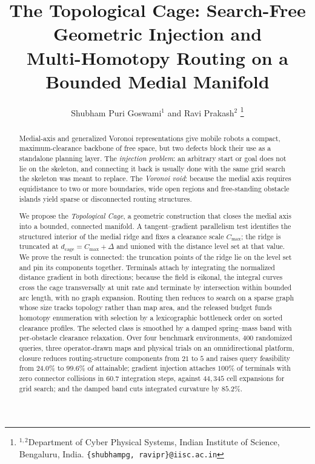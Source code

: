 \documentclass[conference]{IEEEtran}
\begin{document}
\title{\LARGE \bf
The Topological Cage: Search-Free Geometric Injection and \\
Multi-Homotopy Routing on a Bounded Medial Manifold
}

\author{Shubham Puri Goswami$^{1}$ and Ravi Prakash$^{2}$%
\thanks{$^{1,2}$Department of Cyber Physical Systems, Indian Institute of Science, Bengaluru, India. {\tt\small \{shubhampg, ravipr\}@iisc.ac.in}}%
}

\maketitle
\thispagestyle{empty}
\pagestyle{empty}

\begin{abstract}
Medial-axis and generalized Voronoi representations give mobile robots a compact, maximum-clearance backbone of free space, but two defects block their use as a standalone planning layer. The \emph{injection problem}: an arbitrary start or goal does not lie on the skeleton, and connecting it back is usually done with the same grid search the skeleton was meant to replace. The \emph{Voronoi void}: because the medial axis requires equidistance to two or more boundaries, wide open regions and free-standing obstacle islands yield sparse or disconnected routing structures.

We propose the \emph{Topological Cage}, a geometric construction that closes the medial axis into a bounded, connected manifold. A tangent--gradient parallelism test identifies the structured interior of the medial ridge and fixes a clearance scale $C_{\max}$; the ridge is truncated at $d_{\mathrm{cage}}=C_{\max}+\Delta$ and unioned with the distance level set at that value. We prove the result is connected: the truncation points of the ridge lie on the level set and pin its components together. Terminals attach by integrating the normalized distance gradient in both directions; because the field is eikonal, the integral curves cross the cage transversally at unit rate and terminate by intersection within bounded arc length, with no graph expansion. Routing then reduces to search on a sparse graph whose size tracks topology rather than map area, and the released budget funds homotopy enumeration with selection by a lexicographic bottleneck order on sorted clearance profiles. The selected class is smoothed by a damped spring--mass band with per-obstacle clearance relaxation. Over four benchmark environments, $400$ randomized queries, three operator-drawn maps and physical trials on an omnidirectional platform, closure reduces routing-structure components from $21$ to $5$ and raises query feasibility from $24.0\%$ to $99.6\%$ of attainable; gradient injection attaches $100\%$ of terminals with zero connector collisions in $60.7$ integration steps, against $44{,}345$ cell expansions for grid search; and the damped band cuts integrated curvature by $85.2\%$.
\end{abstract}
\end{document}
